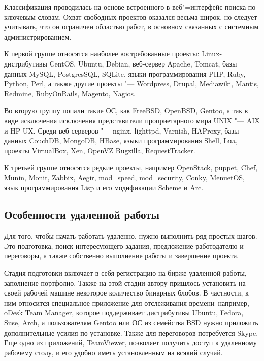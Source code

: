 \documentclass[10pt, a5paper]{article}
\begin{document}
Классификация проводилась на основе встроенного в веб"=интерфейс поиска по ключевым словам. Охват свободных проектов оказался весьма широк, но следует учитывать, что он ограничен областью работ, в основном связанных с системным администрированием.

К первой группе относятся наиболее востребованные проекты: Linux-дистрибутивы CentOS, Ubuntu, Debian, веб-сервер Apache, Tomcat, базы данных MySQL, PostgresSQL, SQLite, языки программирования PHP, Ruby, Python, Perl, а также другие проекты "--- Word\-press, Drupal, Media\-wiki, Mantis, Red\-mine, \linebreak Ruby\-On\-Rails, Ma\-gento, Na\-gios.

Во вторую группу попали такие ОС, как FreeBSD, OpenBSD,  Gentoo, а так в виде исключения исключения представители проприетарного мира UNIX "--- AIX и HP-UX. Среди веб-серверов "--- \linebreak nginx, lighttpd, Varnish, HAProxy, базы данных CouchDB, MongoDB, HBase, языки программирования Shell, Lua, проекты Vir\-tu\-al\-Box, Xen, OpenVZ Bug\-zil\-la, Re\-quest\-Track\-er.

К третьей группе относятся редкие проекты, например \linebreak OpenStack, puppet, Chef, Munin, Monit, Zabbix, Aegir, mod\_speed, mod\_security, Conky, MenuetOS,  язык программирования Lisp и его модификации Scheme и Arc.

\subsection*{Особенности удаленной работы}

Для того, чтобы  начать работать удаленно, нужно выполнить ряд простых шагов. Это подготовка, поиск интересующего задания, предложение работодателю и переговоры, а также собственно выполнение работы и завершение проекта.

Стадия подготовки включает в себя регистрацию на бирже удаленной работы, заполнение портфолио. Также на этой стадии автору пришлось установить на своей рабочей машине некоторое количество бинарных блобов. В частности, к ним относится  специальное  приложение для отслеживания времени--например, oDesk Team Manager, которое поддерживает дистрибутивы Ubuntu, Fedora, Suse, Arch, а пользователям Gentoo или ОС из семейства BSD нужно приложить дополнительные усилия по установке. Также для переговоров потребуется Skype. Еще одно из приложений, TeamViewer, позволяет получить доступ к удаленному рабочему столу, и его удобно иметь установленным на всякий случай.
\end{document}

